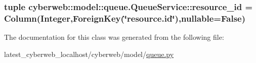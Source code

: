 \hypertarget{classcyberweb_1_1model_1_1queue_1_1_queue_service_a9214c520eaa799da419a8fb2a8a0b52e}{
\subsubsection[{resource\-\_\-id}]{\setlength{\rightskip}{0pt plus 5cm}tuple {\bf cyberweb\-::model\-::queue.\-Queue\-Service\-::resource\-\_\-id} = \-Column(\-Integer,\-Foreign\-Key(\char`\"{}resource.\-id\char`\"{}),nullable=\-False)}}\label{classcyberweb_1_1model_1_1queue_1_1_queue_service_a9214c520eaa799da419a8fb2a8a0b52e}


\-The documentation for this class was generated from the following file\-:\begin{DoxyCompactItemize}
\item 
latest\-\_\-cyberweb\-\_\-localhost/cyberweb/model/\hyperlink{queue_8py}{queue.\-py}\end{DoxyCompactItemize}
